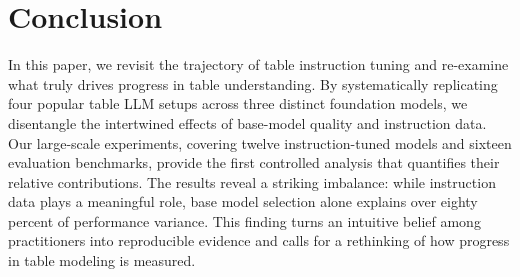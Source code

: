 \documentclass[11pt]{article}
\begin{document}


\section{Conclusion}
In this paper, we revisit the trajectory of table instruction tuning and re-examine what truly drives progress in table understanding. 
By systematically replicating four popular table LLM setups across three distinct foundation models, we disentangle the intertwined effects of base-model quality and instruction data. 
Our large-scale experiments, covering twelve instruction-tuned models and sixteen evaluation benchmarks, provide the first controlled analysis that quantifies their relative contributions. 
The results reveal a striking imbalance: while instruction data plays a meaningful role, base model selection alone explains over eighty percent of performance variance. 
This finding turns an intuitive belief among practitioners into reproducible evidence and calls for a rethinking of how progress in table modeling is measured.
\end{document}
